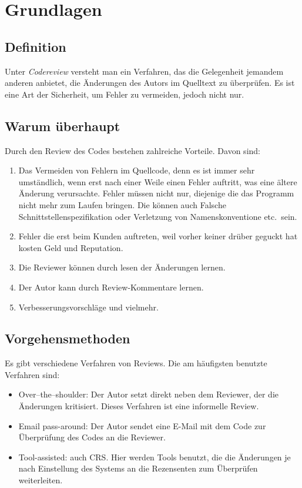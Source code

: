 \section{Grundlagen}
\label{sec:Grundlagen}

\subsection{Definition}
\label{subsec:Definition}
Unter \emph{Codereview} versteht man ein Verfahren, das die Gelegenheit jemandem anderen anbietet, die Änderungen des Autors im Quelltext zu überprüfen.
Es ist eine Art der Sicherheit, um Fehler zu vermeiden, jedoch nicht nur.

\subsection{Warum überhaupt}
\label{subsec:Gründe}
Durch den Review des Codes bestehen zahlreiche Vorteile. Davon sind:

\begin{enumerate}
	\item Das Vermeiden von Fehlern im Quellcode, denn es ist immer sehr umständlich, wenn erst nach einer Weile einen Fehler auftritt, was eine ältere Änderung verursachte.
		Fehler müssen nicht nur, diejenige die das Programm nicht mehr zum Laufen bringen. Die können auch Falsche Schnittstellenspezifikation oder Verletzung von Namenskonventione 
		etc.\ sein.
	\item Fehler die erst beim Kunden auftreten, weil vorher keiner drüber geguckt hat kosten Geld und Reputation.
	\item Die Reviewer können durch lesen der Änderungen lernen.
	\item Der Autor kann durch Review-Kommentare lernen.
	\item Verbesserungsvorschläge und vielmehr.
\end{enumerate}

\subsection{Vorgehensmethoden}
\label{subsec:Vorgehensmethoden}
Es gibt verschiedene Verfahren von Reviews. Die am häufigsten benutzte Verfahren sind:

\begin{itemize}
	\item Over–the–shoulder: Der Autor setzt direkt neben dem Reviewer, der die Änderungen kritisiert. Dieses Verfahren ist eine informelle Review.
	\item Email pass-around: Der Autor sendet eine E-Mail mit dem Code zur Überprüfung des Codes an die Reviewer.
	\item Tool-assisted: auch \ac{CRS}. Hier werden Tools benutzt, die die Änderungen je nach Einstellung des Systems an die Rezensenten zum Überprüfen weiterleiten.
\end{itemize}
